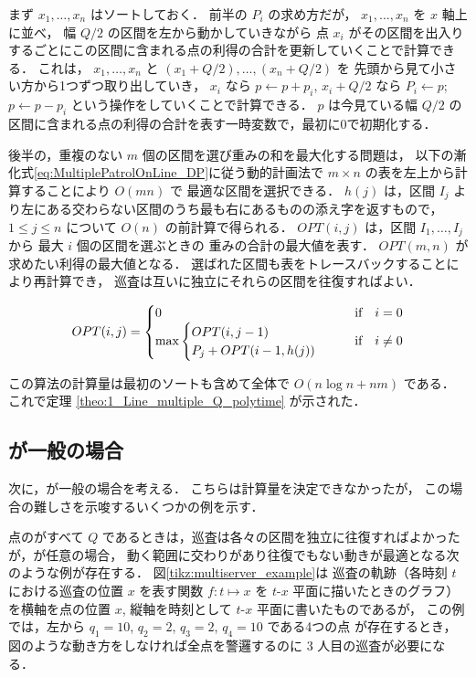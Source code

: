 まず $x_1, \ldots, x_n$ はソートしておく．
前半の $P_i$ の求め方だが，
$x_1, \ldots, x_n$ を $x$ 軸上に並べ，
幅 $Q/2$ の区間を左から動かしていきながら
点 $x_i$ がその区間を出入りするごとにこの区間に含まれる点の利得の合計を更新していくことで計算できる．
これは，
$x_1, \ldots, x_n$ と $(x_1 + Q/2), \ldots, (x_n + Q/2)$ を
先頭から見て小さい方から1つずつ取り出していき，
$x_i$ なら $p \gets p + p_i$, 
$x_i + Q/2$ なら $P_i \gets p$; $p \gets p - p_i$
という操作をしていくことで計算できる．
$p$ は今見ている幅 $Q/2$ の区間に含まれる点の利得の合計を表す一時変数で，最初に0で初期化する．


後半の，重複のない $m$ 個の区間を選び重みの和を最大化する問題は，
以下の漸化式\ref{eq:MultiplePatrolOnLine_DP}に従う動的計画法で
$m \times n$ の表を左上から計算することにより $O(mn)$ で
最適な区間を選択できる．
$h(j)$ は，区間 $I_j$ より左にある交わらない区間のうち最も右にあるものの添え字を返すもので，
$1 \leq j \leq n$ について $O(n)$ の前計算で得られる．
$OPT(i,j)$ は，区間 $I_1, \ldots, I_j$ から 最大 $i$ 個の区間を選ぶときの
重みの合計の最大値を表す．
$OPT(m,n)$ が求めたい利得の最大値となる．
選ばれた区間も表をトレースバックすることにより再計算でき，
巡査は互いに独立にそれらの区間を往復すればよい．

\begin{equation}
	\label{eq:MultiplePatrolOnLine_DP}
	OPT(i, j) = 
	\begin{cases}
		0 & \quad\text{if}\quad i = 0 \\
		\max
		\begin{cases}
			OPT(i, j - 1) \\
			P_j + OPT(i - 1, h(j))
		\end{cases}
		 & \quad\text{if}\quad i \neq 0 \\
	\end{cases}
\end{equation}

この算法の計算量は最初のソートも含めて全体で $O(n \log n + nm)$ である．
これで定理 \ref{theo:1_Line_multiple_Q_polytime} が示された．




\subsection{{\timelimit}が一般の場合}
\label{subsec:Line_different_timelimit}

次に，{\timelimit}が一般の場合を考える．
こちらは計算量を決定できなかったが，
この場合の難しさを示唆するいくつかの例を示す．

点の{\timelimit}がすべて $Q$ であるときは，巡査は各々の区間を独立に往復すればよかったが，{\timelimit}が任意の場合，
動く範囲に交わりがあり往復でもない動きが最適となる次のような例が存在する．
図\ref{tikz:multiserver_example}は
巡査の軌跡（各時刻 $t$ における巡査の位置 $x$ を表す関数 $f : t \mapsto x$ を $t$-$x$ 平面に描いたときのグラフ）
を横軸を点の位置 $x$, 縦軸を時刻として $t$-$x$ 平面に書いたものであるが，
この例では，左から $q_1 = 10$, $q_2 = 2$, $q_3 = 2$, $q_4 = 10$ である4つの点
が存在するとき，図のような動き方をしなければ全点を警邏するのに $3$ 人目の巡査が必要になる．

